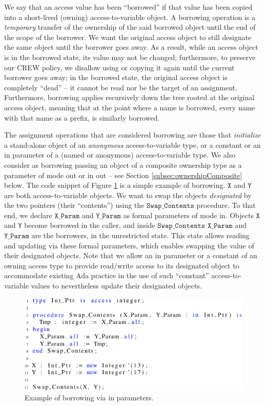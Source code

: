\documentclass{llncs}
\newcommand\var[1]{\ensuremath{\mathtt{#1}}}
\newcommand{\keyword}[1]{\textsf{#1}}
\begin{document}
We say that an access value has been ``borrowed'' if that value has been copied into a short-lived (owning) access-to-variable object.
A borrowing operation is a \textit{temporary} transfer of the ownership of the said borrowed object until the end of the scope of the borrower.
We want the original access object to still designate the same object until the borrower goes away. As a result, while an access object
is in the borrowed state, its value may not be changed; furthermore, to preserve our CREW policy, we disallow using or copying it again until the current borrower goes away; in the borrowed state, the original access object is completely ``dead'' -- it cannot
be read nor be the target of an assignment. Furthermore, borrowing applies recursively down the tree rooted at the original access object, meaning that at the point where a name is borrowed,
every name with that name as a prefix, is similarly borrowed.


The assignment operations that are considered borrowing are those that \textit{initialize} a stand-alone object of an \textit{anonymous} access-to-variable type, or a \keyword{constant} or an \keyword{in} parameter of a (named or anonymous) access-to-variable
type.  We also consider as borrowing passing an object of a composite ownership type
as a parameter of mode \keyword{out} or \keyword{in out} -- see Section \ref{subsec:ownershipComposite} below. The code snippet of Figure \ref{fig:borrow_ex1} is a simple example of borrowing. \var{X} and \var{Y} are both access-to-variable objects. We want to swap the objects \textit{designated} by the two
pointers (their ``contents'') using the \var{Swap\_Contents} procedure. To that end, we declare \var{X\_Param} and \var{Y\_Param} as formal parameters of mode \keyword{in}. Objects \var{X} and \var{Y} become borrowed
in the caller, and inside \var{Swap\_Contents} \var{X\_Param} and \var{Y\_Param} are the borrowers, in the unrestricted state. This state allows reading and updating via these formal parameters, which enables swapping
the value of their designated objects. Note that we allow an \keyword{in} parameter or a constant of an owning access type to provide read/write access to its designated object to accommodate existing Ada practice in the use of such ``constant'' access-to-variable values to nevertheless update their designated objects.

\begin{figure}[htb!]
\centering
   \includegraphics[]{borrow_ex1}
   \caption{Example of borrowing via \keyword{in} parameters.}
   \label{fig:borrow_ex1}
\end{figure}
\end{document}
